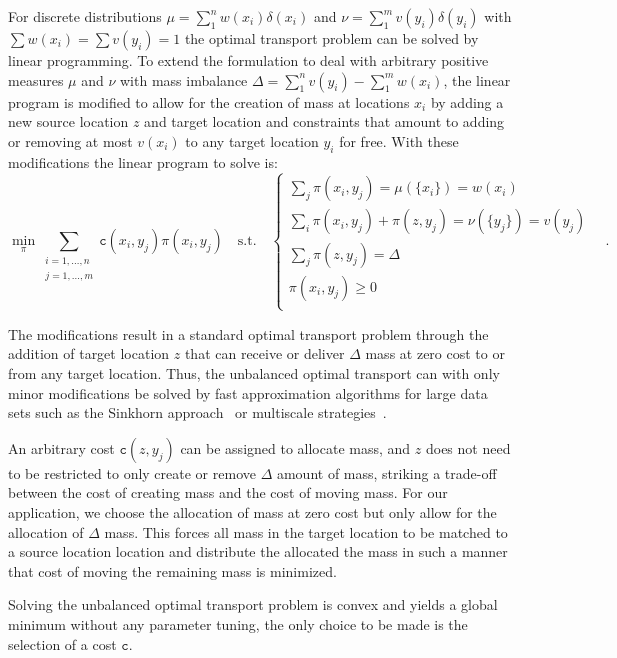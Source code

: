 \documentclass{llncs}
\newcommand{\cost}[0]{\mathtt{c}}
\newcommand{\coupling}[0]{\pi}
\begin{document}
For discrete distributions $\mu = \sum_1^n w(x_i) \delta(x_i)$ and $ \nu =
\sum_1^m v(y_i) \delta(y_i)$ with $\sum w(x_i) = \sum v(y_i) = 1$ the optimal
transport problem can be solved by linear programming. To extend the
formulation to deal with arbitrary positive measures $\mu$ and $\nu$ with mass
imbalance  $\Delta = \sum_1^n v(y_i)  - \sum_1^m w(x_i)$, the linear program is
modified to allow for the creation of mass at locations $x_i$ by adding a new
source location $z$ and target location and constraints that amount to adding
or removing at most $v(x_i)$ to any target location $y_i$ for free. With these
modifications the linear program to solve is: 
\begin{equation}
\min_\coupling \sum_{\substack{i=1,\dots,n\\ j=1,\dots,m}} 
      \cost(x_i, y_j) \coupling(x_i, y_j) \quad \text{s.t.}\quad 
\begin{cases}
  \sum_j \coupling(x_i, y_j)  = \mu(\{x_i\}) = w(x_i) & \\ 
  \sum_i \coupling(x_i, y_j) + \coupling(z, y_j)= \nu(\{y_j\}) = v(y_j) & \\
  \sum_j \coupling(z, y_j)  = \Delta \\
  \coupling(x_i, y_j) \ge 0 \\
\end{cases}\,.
\label{eq:unbalanced}
\end{equation} 

The modifications result in a standard optimal transport problem through the
addition of target location $z$ that can receive or deliver $\Delta$ mass at
zero cost to or from any target location.  Thus, the unbalanced optimal
transport can with only minor modifications be solved by fast approximation
algorithms for large data sets such as the Sinkhorn
approach~\cite{cuturi2013sinkhorn} or multiscale
strategies~\cite{gerber2017multiscale}. 

An arbitrary cost $\cost(z, y_j)$ can be assigned to allocate mass, and $z$
does not need to be restricted to only create or remove $\Delta$ amount of
mass, striking a trade-off between the cost of creating mass and the cost of
moving mass. For our application, we choose the allocation of mass at zero cost
but only allow for the allocation of $\Delta$ mass. This forces all mass in the
target location to be matched to a source location location and distribute the
allocated the mass in such a manner that cost of moving the remaining mass is
minimized.

Solving the unbalanced optimal transport problem is convex and yields a global
minimum without any parameter tuning, the only choice to be made is the
selection of a cost $\cost$.
\end{document}
